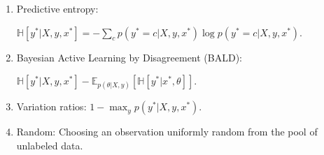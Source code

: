 \begin{enumerate}
  \item Predictive entropy:

  $ \mathbb{H} \left[ y^* | X, y, x^* \right] = - \sum_c p(y^* = c | X, y, x^*) \log p(y^* = c | X, y, x^*)$.

  \item Bayesian Active Learning by Disagreement (BALD):

  $ \mathbb{H} \left[ y^* | X, y, x^* \right] - \mathbb{E}_{p(\theta | X, y)} \left[ \mathbb{H} \left[ y^* | x^*, \theta \right] \right]$.

  \item Variation ratios: $1 - \max_y p(y^* | X, y, x^*)$.

  \item Random: Choosing an observation uniformly random from the pool of unlabeled data.

\end{enumerate}





























